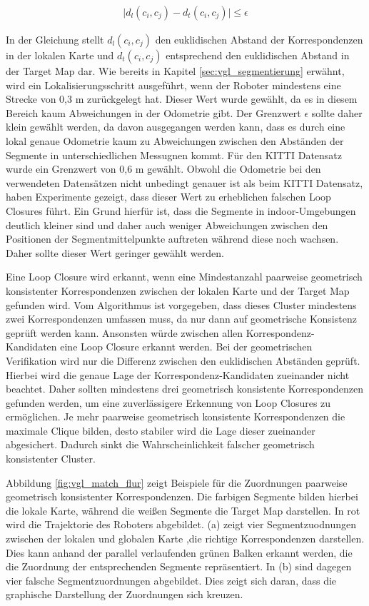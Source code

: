 \begin{align}
	\vert d_l(c_i,c_j)-d_t(c_i,c_j) \vert \leq \epsilon
\end{align}

In der Gleichung stellt $d_l(c_i,c_j)$ den euklidischen Abstand der Korrespondenzen in der lokalen Karte und $d_t(c_i,c_j)$ entsprechend den euklidischen Abstand in der Target Map dar. Wie bereits in Kapitel \ref{sec:vgl_segmentierung} erwähnt, wird ein Lokalisierungsschritt ausgeführt, wenn der Roboter mindestens eine Strecke von 0,3 m zurückgelegt hat. Dieser Wert wurde gewählt, da es in diesem Bereich kaum Abweichungen in der Odometrie gibt. Der Grenzwert $\epsilon$ sollte daher klein gewählt werden, da davon ausgegangen werden kann, dass es durch eine lokal genaue Odometrie kaum zu Abweichungen zwischen den Abständen der Segmente in unterschiedlichen Messugnen kommt. Für den KITTI Datensatz wurde ein Grenzwert von 0,6 m gewählt. Obwohl die Odometrie bei den verwendeten Datensätzen nicht unbedingt genauer ist als beim KITTI Datensatz, haben Experimente gezeigt, dass dieser Wert zu erheblichen falschen Loop Closures führt. Ein Grund hierfür ist, dass die Segmente in indoor-Umgebungen deutlich kleiner sind und daher auch weniger Abweichungen zwischen den Positionen der Segmentmittelpunkte auftreten während diese noch wachsen. Daher sollte dieser Wert geringer gewählt werden.


Eine Loop Closure wird erkannt, wenn eine Mindestanzahl paarweise geometrisch konsistenter Korrespondenzen zwischen der lokalen Karte und der Target Map gefunden wird. Vom Algorithmus ist vorgegeben, dass dieses  Cluster mindestens zwei Korrespondenzen umfassen muss, da nur dann auf geometrische Konsistenz geprüft werden kann. Ansonsten würde zwischen allen Korrespondenz-Kandidaten eine Loop Closure erkannt werden. Bei der geometrischen Verifikation wird nur die Differenz zwischen den euklidischen Abständen geprüft. Hierbei wird die genaue Lage der Korrespondenz-Kandidaten zueinander nicht beachtet. Daher sollten mindestens drei geometrisch konsistente Korrespondenzen gefunden werden, um eine zuverlässigere Erkennung von Loop Closures zu ermöglichen. Je mehr paarweise geometrisch konsistente Korrespondenzen die maximale Clique bilden, desto stabiler wird die Lage dieser zueinander abgesichert. Dadurch sinkt die Wahrscheinlichkeit falscher geometrisch konsistenter Cluster. 

Abbildung \ref{fig:vgl_match_flur} zeigt Beispiele für die Zuordnungen paarweise geometrisch konsistenter Korrespondenzen. Die farbigen Segmente bilden hierbei die lokale Karte, während die weißen Segmente die Target Map darstellen. In rot wird die Trajektorie des Roboters abgebildet. (a) zeigt vier Segmentzuodnungen zwischen der lokalen und globalen Karte ,die richtige Korrespondenzen darstellen. Dies kann anhand der parallel verlaufenden grünen Balken erkannt werden, die die Zuordnung der entsprechenden Segmente repräsentiert. In (b) sind dagegen vier falsche Segmentzuordnungen abgebildet. Dies zeigt sich daran, dass die graphische Darstellung der Zuordnungen sich kreuzen. 

